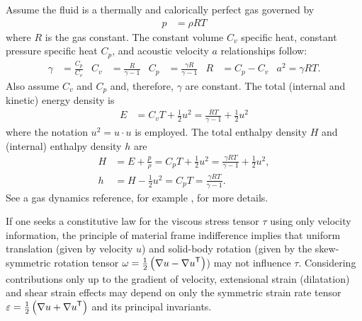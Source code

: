 Assume the fluid is a thermally and calorically perfect gas governed by
\begin{align}
  \label{eq:perfectgaseos}
  p &= \rho{} R T
\end{align}
where $R$ is the gas constant. The constant volume $C_{v}$ specific heat,
constant pressure specific heat $C_{p}$, and acoustic velocity $a$
relationships follow:
\begin{align}
  \label{eq:perfectgasrelations}
  \gamma &= \frac{C_{p}}{C_{v}}
  &
  C_{v} &= \frac{R}{\gamma - 1}
  &
  C_{p} &= \frac{\gamma{}R}{\gamma-1}
  &
  R &= C_{p} - C_{v}
  &
  a^{2} = \gamma{}RT.
\end{align}
Also assume $C_{v}$ and $C_{p}$ and, therefore, $\gamma$ are constant.
The total (internal and kinetic) energy density is
\begin{align}
  \label{eq:perfectgastotalenergy}
  E &= C_{v} T + \frac{1}{2}u^{2}
     = \frac{RT}{\gamma-1} + \frac{1}{2}u^{2}
\end{align}
where the notation $u^2 = u\cdot{}u$ is employed.
The total enthalpy density $H$ and (internal) enthalpy density $h$ are
\begin{align}
  \label{eq:perfectgasenthalpy}
  H &= E + \frac{p}{\rho}
     = C_{p} T + \frac{1}{2}u^{2}
     = \frac{\gamma{}RT}{\gamma-1} + \frac{1}{2}u^{2},
\\
  h &= H - \frac{1}{2}u^{2}
     = C_{p} T
     = \frac{\gamma{}RT}{\gamma-1}
  .
\end{align}
See a gas dynamics reference, for example \citet{LiepmannRoshko2002}, for more
details.

\label{sec:newtonianfluid}

If one seeks a constitutive law for the viscous stress tensor $\tau$
using only velocity information, the principle of material frame
indifference implies that uniform translation (given by velocity $u$)
and solid-body rotation (given by the skew-symmetric rotation tensor
$\omega=\frac{1}{2}\left( \nabla{}u-{\nabla{}u}^{\mathsf{T}} \right)$)
may not influence $\tau$.  Considering contributions only up to the
gradient of velocity, extensional strain (dilatation) and shear strain
effects may depend on only the symmetric strain rate tensor
$\varepsilon=\frac{1}{2}\left( \nabla{}u+{\nabla{}u}^{\mathsf{T}}\right)$
and its principal invariants.

